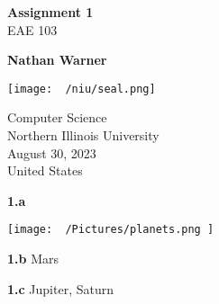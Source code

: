 \documentclass{report}
\title{\Huge{}}
\author{\huge{Nathan Warner}}
\date{\huge{}}
\begin{document}
        \begin{titlepage}
       \begin{center}
           \vspace*{1cm}
    
           \textbf{Assignment 1} \\
           EAE 103
    
           \vspace{0.5cm}
            
                
           \vspace{1.5cm}
    
           \textbf{Nathan Warner}
    
           \vfill
                
                
           \vspace{0.8cm}
         
           \texttt{[image: ~/niu/seal.png]}
                
           Computer Science \\
           Northern Illinois University\\
           August 30, 2023 \\
           United States\\
           
                
       \end{center}
    \end{titlepage}
    \pagebreak \bigbreak \noindent
    \textbf{1.a}
    \bigbreak \noindent 
    \begin{center}
        \texttt{[image:  ~/Pictures/planets.png ]}
    \end{center}

    \bigbreak \noindent 
    \textbf{1.b} Mars

    \bigbreak \noindent 
    \textbf{1.c} Jupiter, Saturn
\end{document}
